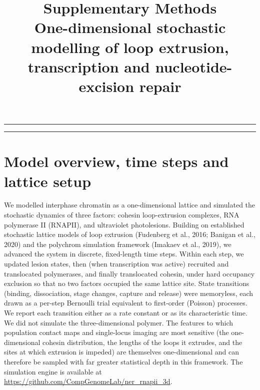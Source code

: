 \documentclass[11pt]{article}
\title{\vspace{-2.0em}\textbf{Supplementary Methods}\\[0.35em]
\large One-dimensional stochastic modelling of loop extrusion, transcription
and nucleotide-excision repair}
\date{}
\author{}
\begin{document}
\maketitle
\vspace{-1.0em}

\begingroup
\setlength{\parskip}{0pt}
\renewcommand{\contentsname}{Topics covered}
\noindent\rule{\linewidth}{0.8pt}\par\nobreak
\tableofcontents
\nobreak\vspace{3pt}
\noindent\rule{\linewidth}{0.8pt}
\endgroup
\bigskip

\section{Model overview, time steps and lattice setup}

We modelled interphase chromatin as a one-dimensional lattice and simulated the
stochastic dynamics of three factors: cohesin loop-extrusion complexes, RNA
polymerase II (RNAPII), and ultraviolet photolesions. Building on established stochastic
lattice models of loop extrusion (Fudenberg et al., 2016; Banigan et al., 2020)
and the polychrom simulation framework (Imakaev et al., 2019), we advanced the
system in discrete, fixed-length time steps. Within each step, we updated lesion
states, then (when transcription was active) recruited and translocated
polymerases, and finally translocated cohesin, under hard occupancy exclusion so
that no two factors occupied the same lattice site. State transitions (binding,
dissociation, stage changes, capture and release) were memoryless, each drawn as
a per-step Bernoulli trial equivalent to first-order (Poisson) processes. We
report each transition either as a rate constant or as its characteristic time.
We did not simulate the three-dimensional polymer. The features to which
population contact maps and single-locus imaging are most sensitive (the
one-dimensional cohesin distribution, the lengths of the loops it extrudes, and
the sites at which extrusion is impeded) are themselves one-dimensional and can
therefore be sampled with far greater statistical depth in this framework. The
simulation engine is available at \url{https://github.com/CompGenomeLab/ner_rnapii_3d}.
\end{document}
